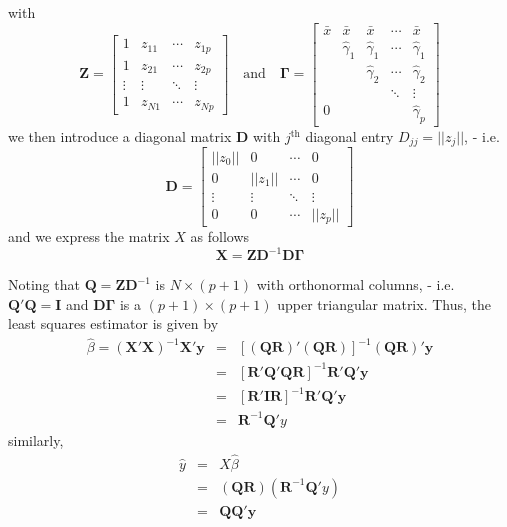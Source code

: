 \documentclass{beamer}
\newcommand{\X}{\bm{X}}
\begin{document}
\begin{frame}
with 
\[
\bm{Z}=
\begin{bmatrix}
1 & z_{11} & \cdots & z_{1p}\\
1& z_{21} &\cdots&z_{2p}\\
\vdots&\vdots&\ddots&\vdots\\
1& z_{N1}&\cdots &z_{Np}
\end{bmatrix}\quad\text{and}\quad
\bm{\Gamma}=
\begin{bmatrix}
\bar{x}&\bar{x}&\bar{x}&\cdots&\bar{x}\\
&\hat{\gamma}_{1}&\hat{\gamma}_{1}&\cdots&\hat{\gamma}_1\\
&&\hat{\gamma}_{2}&\cdots& \hat{\gamma}_2\\
&&&\ddots&\vdots\\
0&&&&\hat{\gamma}_p
\end{bmatrix}
\]
we then introduce a diagonal matrix $\bm{D}$ with $j^{\text{th}}$ diagonal entry $D_{jj}=\lvert\lvert z_j\rvert\rvert$, - i.e. 
\[
\bm{D}=
\begin{bmatrix}
\lvert\lvert z_0\rvert\rvert&0&\cdots&0\\
0&\lvert\lvert z_1\rvert\rvert&\cdots&0\\
\vdots&\vdots&\ddots&\vdots\\
0&0&\cdots&\lvert\lvert z_p\rvert\rvert
\end{bmatrix}
\]
and we express the matrix $X$ as follows
\[
\X=\bm{Z}\bm{D}^{-1}\bm{D}\bm{\Gamma}
\]
\end{frame}
\begin{frame}
Noting that $\bm{Q}=\bm{Z}\bm{D}^{-1}$ is $N\times (p+1)$ with orthonormal columns, - i.e. $\bm{Q}'\bm{Q}=\bm{I}$ and $\bm{D\Gamma}$ is a $(p+1)\times(p+1)$ upper triangular matrix. 
Thus, the least squares estimator is given by
\begin{eqnarray*}
\hat{\beta}=(\X'\X)^{-1}\X'\bm{y}&=&[(\bm{Q}\bm{R})'(\bm{Q}\bm{R})]^{-1}(\bm{Q}\bm{R})'\bm{y}\\
&=&[\bm{R}'\bm{Q}'\bm{Q}\bm{R}]^{-1}\bm{R}'\bm{Q}'\bm{y}\\
&=&[\bm{R}'\bm{I}\bm{R}]^{-1}\bm{R}'\bm{Q}'\bm{y}\\
&=&\bm{R}^{-1}\bm{Q}'y
\end{eqnarray*}
similarly,
\begin{eqnarray*}
\hat{y}&=&X\hat{\beta}\\
&=&(\bm{QR})(\bm{R}^{-1}\bm{Q}'y)\\
&=&\bm{Q}\bm{Q}'\bm{y}
\end{eqnarray*}
\end{frame}
\end{document}
